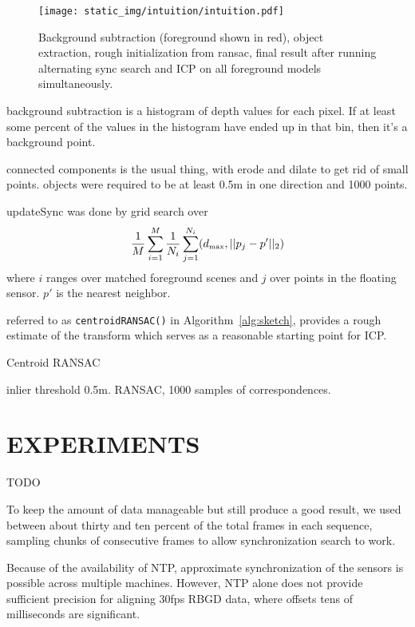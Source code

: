 \documentclass[letterpaper, 10 pt, conference]{ieeeconf}  %
\begin{document}
\begin{figure*}
  \centering
  \texttt{[image: static\_img/intuition/intuition.pdf]}
  \caption{Background subtraction (foreground shown in red), object extraction, rough initialization from ransac, final result after running alternating sync search and ICP on all foreground models simultaneously. }
  \label{fig:}
\end{figure*}


background subtraction is a histogram of depth values for each pixel.  If at least some percent of the values in the histogram have ended up in that bin, then it's a background point.

connected components is the usual thing, with erode and dilate to get rid of small points.  objects were required to be at least 0.5m in one direction and 1000 points.

updateSync was done by grid search over
\newcommand{\dmax}{d_{\mbox{\tiny{max}}}}
\begin{align*}
  \frac{1}{M} \sum_{i=1}^M \frac{1}{N_i} \sum_{j=1}^{N_i}    (\dmax, ||p_j - p'||_2)
\end{align*}
where $i$ ranges over matched foreground scenes and $j$ over points in the floating sensor.  $p'$ is the nearest neighbor.


referred to as \texttt{centroidRANSAC()} in Algorithm~\ref{alg:sketch}, provides a rough estimate of the transform which serves as a reasonable starting point for ICP.


\begin{algorithm}
  \caption{Centroid RANSAC}
  \label{alg:cal}
  \SetLine
  \phantom{\;}
  inlier threshold 0.5m.  RANSAC, 1000 samples of correspondences.
\end{algorithm}



\section{EXPERIMENTS}
TODO

To keep the amount of data manageable but still produce a good result, we used between about thirty and ten percent of the total frames in each sequence, sampling chunks of consecutive frames to allow synchronization search to work.

Because of the availability of NTP, approximate synchronization of the sensors is possible across multiple machines.  However, NTP alone does not provide sufficient precision for aligning 30fps RBGD data, where offsets tens of milliseconds are significant.
\end{document}
